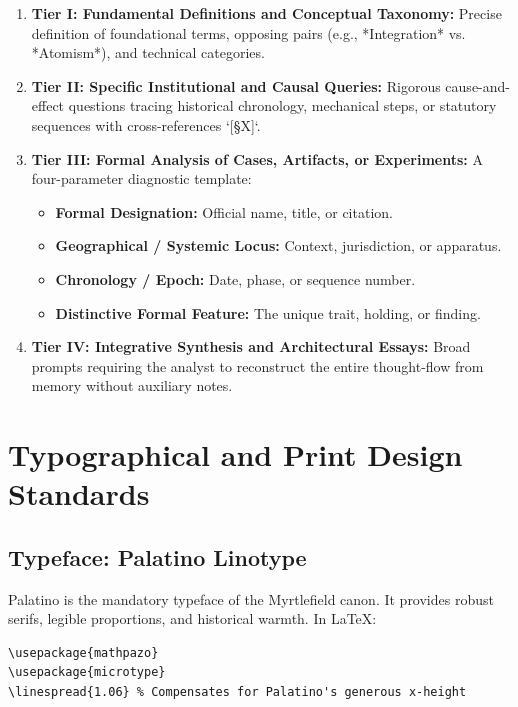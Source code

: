 \documentclass[11pt,letterpaper]{article}
\begin{document}
\begin{enumerate}[label=\textbf{\Roman*.}]
  \item \textbf{Tier I: Fundamental Definitions and Conceptual Taxonomy:} Precise definition of foundational terms, opposing pairs (e.g., *Integration* vs. *Atomism*), and technical categories.
  \item \textbf{Tier II: Specific Institutional and Causal Queries:} Rigorous cause-and-effect questions tracing historical chronology, mechanical steps, or statutory sequences with cross-references `[§X]`.
  \item \textbf{Tier III: Formal Analysis of Cases, Artifacts, or Experiments:} A four-parameter diagnostic template:
  \begin{itemize}
    \item \textbf{Formal Designation:} Official name, title, or citation.
    \item \textbf{Geographical / Systemic Locus:} Context, jurisdiction, or apparatus.
    \item \textbf{Chronology / Epoch:} Date, phase, or sequence number.
    \item \textbf{Distinctive Formal Feature:} The unique trait, holding, or finding.
  \end{itemize}
  \item \textbf{Tier IV: Integrative Synthesis and Architectural Essays:} Broad prompts requiring the analyst to reconstruct the entire thought-flow from memory without auxiliary notes.
\end{enumerate}

\section{Typographical and Print Design Standards}

\subsection{Typeface: Palatino Linotype}
Palatino is the mandatory typeface of the Myrtlefield canon. It provides robust serifs, legible proportions, and historical warmth. In \LaTeX{}:
\begin{lstlisting}
\usepackage{mathpazo}
\usepackage{microtype}
\linespread{1.06} % Compensates for Palatino's generous x-height
\end{lstlisting}
\end{document}
